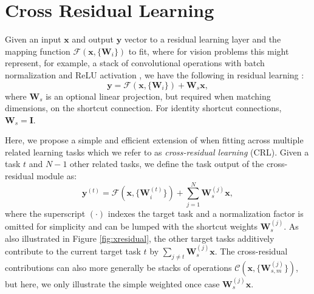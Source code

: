\documentclass{sig-alternate-05-2015}
\newcommand{\mb}{\mathbf}
\begin{document}
\section{Cross Residual Learning}
\label{sec:xresidual}

Given an input $\mb x$ and output $\mb y$ vector to a residual learning layer and the mapping function $\mathcal{F}(\mb x, \{\mb W_i\})$ to fit, where for vision problems this might represent, for example, a stack of convolutional operations with batch normalization \cite{ioffe_2015} and ReLU activation \cite{nair_2010}, we have the following in residual learning \cite{he_2016}:
%
\begin{equation}
  \mb y = \mathcal{F}(\mb x, \{\mb W_i\}) + \mb W_s\mb x,
  \label{eq:residual}
\end{equation}
%
where $\mb W_s$ is an optional linear projection, but required when matching dimensions, on the shortcut connection.
For identity shortcut connections, $\mb W_s = \mb I$.

Here, we propose a simple and efficient extension of \cite{he_2016} when fitting across multiple related learning tasks which we refer to as \emph{cross-residual learning} (CRL).
Given a task $t$ and $N-1$ other related tasks, we define the task output of the cross-residual module as:
%
\begin{equation}
  \mb y^{(t)} = \mathcal{F}(\mb x, \{\mb W_i^{(t)}\}) + \sum_{j=1}^N \mb W_s^{(j)}\mb x,
  \label{eq:xresidual}
\end{equation}
%
where the superscript $(\cdot)$ indexes the target task and a normalization factor is omitted for simplicity and can be lumped with the shortcut weights $\mb W_s^{(j)}$.
As also illustrated in Figure \ref{fig:xresidual}, the other target tasks additively contribute to the current target task $t$ by $\sum_{j\neq t}\mb W_s^{(j)}\mb x$.
The cross-residual contributions can also more generally be stacks of operations $\mathcal{C}(\mb x,\{\mb W_{s,m}^{(j)}\})$, but here, we only illustrate the simple weighted once case $\mb W_s^{(j)}\mb x$.
\end{document}
